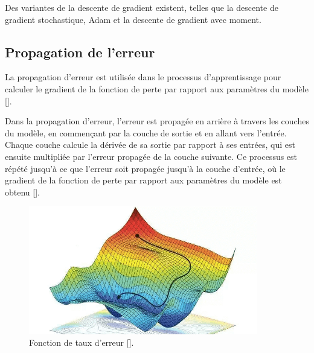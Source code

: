 Des variantes de la descente de gradient existent, telles que la descente de
gradient stochastique, Adam et la descente de gradient avec moment.

\subsection{Propagation de l’erreur}
La propagation d'erreur est utilisée dans le processus d'apprentissage pour
calculer le gradient de la fonction de perte par rapport aux paramètres du
modèle [\cite{Goodfellow-et-al-2016}].

Dans la propagation d'erreur, l'erreur est propagée en arrière à travers les
couches du modèle, en commençant par la couche de sortie et en allant vers
l'entrée. Chaque couche calcule la dérivée de sa sortie par rapport à ses
entrées, qui est ensuite multipliée par l'erreur propagée de la couche
suivante. Ce processus est répété jusqu'à ce que l'erreur soit propagée jusqu'à
la couche d'entrée, où le gradient de la fonction de perte par rapport aux
paramètres du modèle est obtenu [\cite{Goodfellow-et-al-2016}].

\begin{figure}[hbt!]
	\centering
	\includegraphics[width=10cm]{images_pfe/gd.png}
	\caption{Fonction de taux d’erreur [\cite{amini2018spatial}].}
	\label{fig:error-function}
\end{figure}
\FloatBarrier
\medskip

